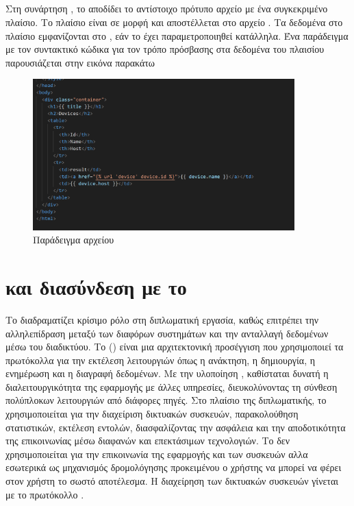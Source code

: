 \subsection{}
Στη συνάρτηση , το  αποδίδει το αντίστοιχο πρότυπο 
αρχείο με ένα συγκεκριμένο πλαίσιο. Το πλαίσιο είναι σε μορφή  και αποστέλλεται στο αρχείο . Τα δεδομένα στο πλαίσιο εμφανίζονται
στο , εάν το  έχει παραμετροποιηθεί κατάλληλα. Ένα παράδειγμα  με
τον συντακτικό κώδικα για τον τρόπο πρόσβασης στα δεδομένα του πλαισίου παρουσιάζεται στην εικόνα παρακάτω



\begin{figure}[htb]
	\centering
	\includegraphics[width=0.9\textwidth]{graphics/html_template.png}
	\caption{Παράδειγμα  αρχείου }
\end{figure}


\section{ και διασύνδεση με το }

Το  διαδραματίζει κρίσιμο ρόλο στη 
διπλωματική εργασία, καθώς επιτρέπει την αλληλεπίδραση μεταξύ των 
διαφόρων συστημάτων και την ανταλλαγή δεδομένων μέσω του διαδικτύου. 
Το  () είναι μια 
αρχιτεκτονική προσέγγιση που χρησιμοποιεί τα πρωτόκολλα  
για την εκτέλεση λειτουργιών όπως η ανάκτηση, η δημιουργία, η 
ενημέρωση και η διαγραφή δεδομένων. Με την υλοποίηση , 
καθίσταται δυνατή η διαλειτουργικότητα της εφαρμογής με άλλες 
υπηρεσίες, διευκολύνοντας τη σύνθεση πολύπλοκων λειτουργιών από 
διάφορες πηγές. Στο πλαίσιο της διπλωματικής, το  
χρησιμοποιείται για την διαχείριση δικτυακών συσκευών, παρακολούθηση 
στατιστικών, εκτέλεση εντολών, διασφαλίζοντας την ασφάλεια και την 
αποδοτικότητα της επικοινωνίας μέσω διαφανών και επεκτάσιμων 
τεχνολογιών. Το  δεν χρησιμοποιείται για την επικοινωνία της εφαρμογής
και των συσκευών αλλα εσωτερικά ως μηχανισμός δρομολόγησης προκειμένου ο χρήστης
να μπορεί να φέρει στον χρήστη το σωστό αποτέλεσμα. Η διαχείρηση των δικτυακών
συσκευών γίνεται με το πρωτόκολλο .

